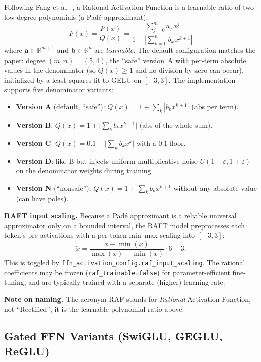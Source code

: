 Following Fang et al.~\citep{fang2023raft}, a Rational Activation Function is a
learnable ratio of two low-degree polynomials (a Padé approximant):
\[
F(x) = \frac{P(x)}{Q(x)} = \frac{\displaystyle\sum_{j=0}^{m} a_j\, x^{j}}{1 + \left|\displaystyle\sum_{k=0}^{n} b_k\, x^{k+1}\right|}
\]
where $\mathbf{a}\in\mathbb{R}^{m+1}$ and $\mathbf{b}\in\mathbb{R}^{n}$ are
\emph{learnable}. The default configuration matches the paper: degree
$(m,n)=(5,4)$, the ``safe'' version~A with per-term absolute values in the
denominator (so $Q(x)\ge 1$ and no division-by-zero can occur), initialized by
a least-squares fit to GELU on $[-3,3]$. The implementation supports five
denominator variants:

\begin{itemize}[leftmargin=*]
    \item \textbf{Version A} (default, ``safe''): $Q(x)=1+\sum_k|b_k x^{k+1}|$ (abs per term).
    \item \textbf{Version B}: $Q(x)=1+\big|\sum_k b_k x^{k+1}\big|$ (abs of the whole sum).
    \item \textbf{Version C}: $Q(x)=0.1+\big|\sum_k b_k x^k\big|$ with a $0.1$ floor.
    \item \textbf{Version D}: like B but injects uniform multiplicative noise $U(1-\varepsilon,1+\varepsilon)$ on the denominator weights during training.
    \item \textbf{Version N} (``nonsafe''): $Q(x)=1+\sum_k b_k x^{k+1}$ without any absolute value (can have poles).
\end{itemize}

\textbf{RAFT input scaling.} Because a Padé approximant is a reliable
universal approximator only on a bounded interval, the RAFT model preprocesses
each token's pre-activations with a per-token min--max scaling into $[-3,3]$:
\[
\tilde{x} = \frac{x-\min(x)}{\max(x)-\min(x)}\cdot 6 - 3.
\]
This is toggled by \texttt{ffn\_activation\_config.raf\_input\_scaling}. The
rational coefficients may be frozen (\texttt{raf\_trainable=false}) for
parameter-efficient fine-tuning, and are typically trained with a separate
(higher) learning rate.

\textbf{Note on naming.} The acronym RAF stands for \emph{Rational} Activation
Function, not ``Rectified''; it is the learnable polynomial ratio above.

\subsection{Gated FFN Variants (SwiGLU, GEGLU, ReGLU)}
\label{sec:glu}

